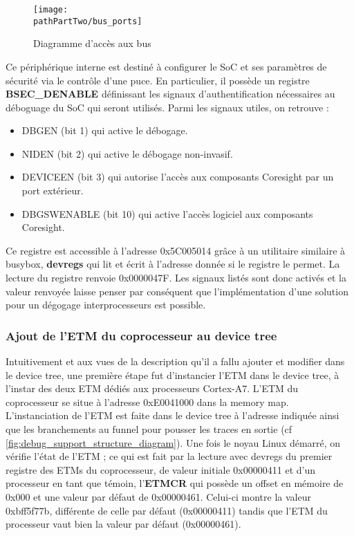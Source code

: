 \begin{figure}[H]
	\begin{center}
		\texttt{[image: \\pathPartTwo/bus\_ports]}
		\caption{Diagramme d'accès aux bus}
	    \label{fig:bus_ports}
	\end{center}
\end{figure}

Ce périphérique interne est destiné à configurer le SoC et ses paramètres de
sécurité via le contrôle d'une puce. En particulier, il possède un registre
\textbf{BSEC\_DENABLE} définissant les signaux d'authentification nécessaires
au déboguage du SoC qui seront utilisés. Parmi les signaux utiles, on retrouve
:

\begin{itemize}[label=\textbullet]
    \item DBGEN (bit 1) qui active le débogage.
    \item NIDEN (bit 2) qui active le débogage non-invasif.
    \item DEVICEEN (bit 3) qui autorise l'accès aux composants Coresight par
        un port extérieur.
    \item DBGSWENABLE (bit 10) qui active l'accès logiciel aux composants
        Coresight.
\end{itemize}

Ce registre est accessible à l'adresse 0x5C005014 grâce à un utilitaire
similaire à busybox, \textbf{devregs} qui lit et écrit à l'adresse donnée si
le registre le permet. La lecture du registre renvoie 0x0000047F. Les signaux
listés sont donc activés et la valeur renvoyée laisse penser par conséquent
que l'implémentation d'une solution pour un dégogage interprocesseurs est
possible.

\subsubsection{Ajout de l'ETM du coprocesseur au device tree}
\label{sec:add_etm_m4_dt}

Intuitivement et aux vues de la description qu'il a fallu ajouter et modifier
dans le device tree, une première étape fut d'instancier l'ETM dans le device
tree, à l'instar des deux ETM dédiés aux processeurs Cortex-A7. L'ETM du
coprocesseur se situe à l'adresse 0xE0041000 dans la memory map. \\

L'instanciation de l'ETM est faite dans le device tree à l'adresse indiquée
ainsi que les branchements au funnel pour pousser les traces en sortie (cf
\ref{fig:debug_support_structure_diagram}). Une fois le noyau Linux démarré,
on vérifie l'état de l'ETM ; ce qui est fait par la lecture avec devregs du
premier registre des ETMs du coprocesseur, de valeur initiale 0x00000411 et
d'un processeur en tant que témoin, l'\textbf{ETMCR} qui possède un offset en
mémoire de 0x000 et une valeur par défaut de 0x00000461. Celui-ci montre la
valeur 0xbff5f77b, différente de celle par défaut (0x00000411) tandis que
l'ETM du processeur vaut bien la valeur par défaut (0x00000461). \\

